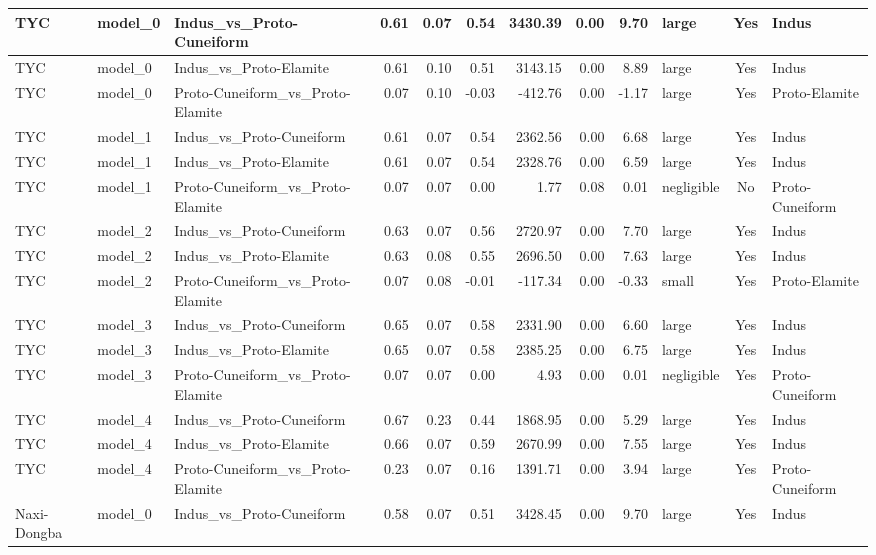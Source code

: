 \documentclass[11pt,a4paper,oneside]{report}
\begin{document}
\begin{landscape}
\begin{scriptsize}
\begin{longtable}{|l|l|l|r|r|r|r|r|r|l|c|l|}
TYC & model\_0 & Indus\_vs\_Proto-Cuneiform & 0.61 & 0.07 & 0.54 & 3430.39 & 0.00 & 9.70 & large & Yes & Indus \\ \hline
TYC & model\_0 & Indus\_vs\_Proto-Elamite & 0.61 & 0.10 & 0.51 & 3143.15 & 0.00 & 8.89 & large & Yes & Indus \\ \hline
TYC & model\_0 & Proto-Cuneiform\_vs\_Proto-Elamite & 0.07 & 0.10 & -0.03 & -412.76 & 0.00 & -1.17 & large & Yes & Proto-Elamite \\ \hline
TYC & model\_1 & Indus\_vs\_Proto-Cuneiform & 0.61 & 0.07 & 0.54 & 2362.56 & 0.00 & 6.68 & large & Yes & Indus \\ \hline
TYC & model\_1 & Indus\_vs\_Proto-Elamite & 0.61 & 0.07 & 0.54 & 2328.76 & 0.00 & 6.59 & large & Yes & Indus \\ \hline
TYC & model\_1 & Proto-Cuneiform\_vs\_Proto-Elamite & 0.07 & 0.07 & 0.00 & 1.77 & 0.08 & 0.01 & negligible & No & Proto-Cuneiform \\ \hline
TYC & model\_2 & Indus\_vs\_Proto-Cuneiform & 0.63 & 0.07 & 0.56 & 2720.97 & 0.00 & 7.70 & large & Yes & Indus \\ \hline
TYC & model\_2 & Indus\_vs\_Proto-Elamite & 0.63 & 0.08 & 0.55 & 2696.50 & 0.00 & 7.63 & large & Yes & Indus \\ \hline
TYC & model\_2 & Proto-Cuneiform\_vs\_Proto-Elamite & 0.07 & 0.08 & -0.01 & -117.34 & 0.00 & -0.33 & small & Yes & Proto-Elamite \\ \hline
TYC & model\_3 & Indus\_vs\_Proto-Cuneiform & 0.65 & 0.07 & 0.58 & 2331.90 & 0.00 & 6.60 & large & Yes & Indus \\ \hline
TYC & model\_3 & Indus\_vs\_Proto-Elamite & 0.65 & 0.07 & 0.58 & 2385.25 & 0.00 & 6.75 & large & Yes & Indus \\ \hline
TYC & model\_3 & Proto-Cuneiform\_vs\_Proto-Elamite & 0.07 & 0.07 & 0.00 & 4.93 & 0.00 & 0.01 & negligible & Yes & Proto-Cuneiform \\ \hline
TYC & model\_4 & Indus\_vs\_Proto-Cuneiform & 0.67 & 0.23 & 0.44 & 1868.95 & 0.00 & 5.29 & large & Yes & Indus \\ \hline
TYC & model\_4 & Indus\_vs\_Proto-Elamite & 0.66 & 0.07 & 0.59 & 2670.99 & 0.00 & 7.55 & large & Yes & Indus \\ \hline
TYC & model\_4 & Proto-Cuneiform\_vs\_Proto-Elamite & 0.23 & 0.07 & 0.16 & 1391.71 & 0.00 & 3.94 & large & Yes & Proto-Cuneiform \\ \hline
Naxi-Dongba & model\_0 & Indus\_vs\_Proto-Cuneiform & 0.58 & 0.07 & 0.51 & 3428.45 & 0.00 & 9.70 & large & Yes & Indus \\ \hline

\end{longtable}
\end{scriptsize}
\end{landscape}
\end{document}

